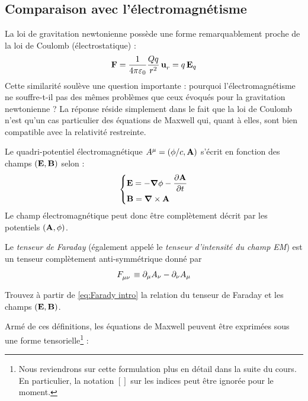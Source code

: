 \subsection{Comparaison avec l'électromagnétisme}
La loi de gravitation newtonienne possède une forme remarquablement proche de la loi de Coulomb (électrostatique) :
\begin{align}
    \vect{F} = \frac{1}{4\pi \varepsilon_0} \frac{Q q}{r^2} \,\vect{u}\indices{_r} = q \,\vect{E}_q
\end{align}
Cette similarité soulève une question importante : pourquoi l'électromagnétisme ne souffre-t-il pas des mêmes problèmes que ceux évoqués pour la gravitation newtonienne ? La réponse réside simplement dans le fait que  la loi de Coulomb n'est qu'un cas particulier des équations de Maxwell qui, quant à elles, sont bien compatible avec la relativité restreinte. 
\begin{rap}
    Le quadri-potentiel électromagnétique $A^\mu = (\phi/c,\bm{\mathrm{A}})$ s'écrit en fonction des champs $(\bm{\mathrm{E}},\bm{\mathrm{B}})$ selon :
    \begin{align}
        \begin{dcases}
            \bm{\mathrm{E}} = - \bm{\mathrm{\nabla}} \phi - \frac{\partial \bm{\mathrm{A}}}{\partial t} \\
            \bm{\mathrm{B}} = \bm{\mathrm{\nabla}} \times \bm{\mathrm{A}}
        \end{dcases}
    \end{align}
    Le champ électromagnétique peut donc être complètement décrit par les potentiels $(\bm{\mathrm{A}},\phi)$. 
\end{rap}
\begin{rap}
    Le \emph{tenseur de Faraday} (également appelé le \emph{tenseur d'intensité du champ EM}) est un tenseur complètement anti-symmétrique donné par
    \begin{equation}
    \label{eq:Farady intro}
        F\indices{_\mu_\nu} \deq \pd_\mu A_\nu - \pd_\nu A_\mu
    \end{equation}
\end{rap}
\begin{exerc}
    Trouvez à partir de \ref{eq:Farady intro} la relation du tenseur de Faraday et les champs $(\bm{\mathrm{E}},\bm{\mathrm{B}})$.
\end{exerc}
\cutebreak
Armé de ces définitions, les équations de Maxwell peuvent être exprimées sous une forme tensorielle\footnote{Nous reviendrons sur cette formulation plus en détail dans la suite du cours. En particulier, la notation $[]$ sur les indices peut être ignorée pour le moment.} :
